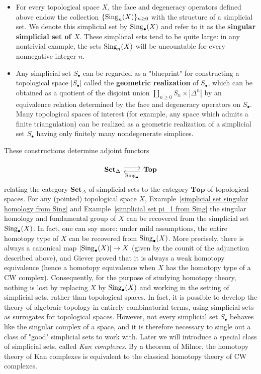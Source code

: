 \begin{itemize}
\item For every topological space $X$, the face and degeneracy operators defined above endow the collection $\{\mathrm{Sing}_n(X)\}_{n\geq 0}$ with the structure of a simplicial set. We denote this simplicial set by $\mathrm{Sing}_\bullet(X)$ and refer to it as the \textbf{singular simplicial set of $X$}. These simplicial sets tend to be quite large: in any nontrivial example, the sets $\mathrm{Sing}_n(X)$ will be uncountable for every nonnegative integer $n$.
\item Any simplicial set $S_\bullet$ can be regarded as a "blueprint" for constructing a topological space $|S_\bullet|$ called the \textbf{geometric realization} of $S_\bullet$, which can be obtained as a quotient of the disjoint union $\coprod_{n\geq 0}S_n\times|\Delta^n|$ by an equivalence relation determined by the face and degeneracy operators on $S_\bullet$. Many topological spaces of interest (for example, any space which admits a finite triangulation) can be realized as a geometric realization of a simplicial set $S_\bullet$ having only finitely many nondegenerate simplices.
\end{itemize}
These constructions determine adjoint functors
\[\begin{tikzcd}
\mathbf{Set}_{\Delta}\ar[r,shift left=1mm,"|\ |"]&\mathbf{Top}\ar[l,shift left=1mm,"\Sing_\bullet"]
\end{tikzcd}\]
relating the category $\mathbf{Set}_\Delta$ of simplicial sets to the category $\mathbf{Top}$ of topological spaces. For any (pointed) topological space $X$, Example~\ref{simplicial set singular homology from Sing} and Example~\ref{simplicial set pi_1 from Sing} the singular homology and fundamental group of $X$ can be recovered from the simplicial set $\mathrm{Sing}_\bullet(X)$. In fact, one can say more: under mild assumptions, the entire homotopy type of $X$ can be recovered from $\mathrm{Sing}_\bullet(X)$. More precisely, there is always a canonical map $|\mathrm{Sing}_\bullet(X)|\to X$ (given by the counit of the adjunction described above), and Giever proved that it is always a weak homotopy equivalence (hence a homotopy equivalence when $X$ has the homotopy type of a CW complex). Consequently, for the purpose of studying homotopy theory, nothing is lost by replacing $X$ by $\mathrm{Sing}_\bullet(X)$ and working in the setting of simplicial sets, rather than topological spaces. In fact, it is possible to develop the theory of algebraic topology in entirely combinatorial terms, using simplicial sets as surrogates for topological spaces. However, not every simplicial set $S_\bullet$ behaves like the singular complex of a space, and it is therefore necessary to single out a class of "good" simplicial sets to work with. Later we will introduce a special class of simplicial sets, called \textit{Kan complexes}. By a theorem of Milnor, the homotopy theory of Kan complexes is equivalent to the classical homotopy theory of CW complexes.
